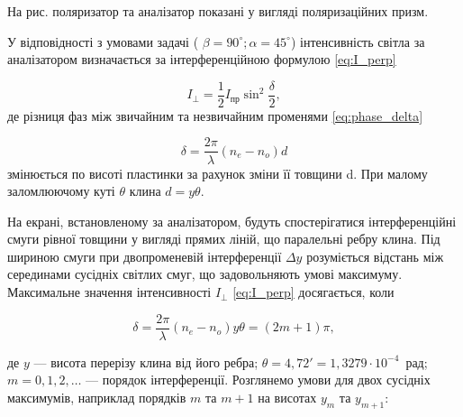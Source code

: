\begin{solutionexample}

\begin{center}
    
\end{center}

На рис. поляризатор та аналізатор показані у вигляді поляризаційних призм.

У відповідності з умовами задачі ( $ \beta = 90^\circ; \alpha = 45^\circ $) інтенсивність світла за аналізатором визначається за інтерференційною формулою \eqref{eq:I_perp}

\begin{equation*}
    I_{\perp} = \frac{1}{2} I_\text{пр} \sin^2 \frac{\delta}{2},
\end{equation*}
де різниця фаз між звичайним та незвичайним променями \eqref{eq:phase_delta}

\begin{equation*}
    \delta = \frac{2\pi}{\lambda} (n_e - n_o)d
\end{equation*}
змінюється по висоті пластинки за рахунок зміни її товщини d. При
малому заломлюючому куті $ \theta $ клина $ d = y\theta $.

На екрані, встановленому за аналізатором, будуть спостерігатися інтерференційні смуги рівної товщини у вигляді прямих ліній, що паралельні ребру клина. Під шириною смуги при двопроменевій інтерференції $ \Delta y $ розуміється відстань між серединами сусідніх світлих смуг, що задовольняють умові максимуму. Максимальне значення інтенсивності $ I_\perp $ \eqref{eq:I_perp} досягається, коли

\begin{equation*}
    \delta = \frac{2\pi}{\lambda} (n_e - n_o)y\theta = (2m + 1)\pi,
\end{equation*}

де $ y $ --- висота перерізу клина від його ребра; $ \theta = 4,72' = 1,3279\cdot10^{-4} $~рад; $ m = 0,1,2,\ldots $ --- порядок інтерференції.
Розглянемо умови для двох сусідніх максимумів, наприклад порядків
$ m $ та $ m + 1 $ на висотах $ y_m $ та $ y_{m+1} $:


\end{solutionexample}
